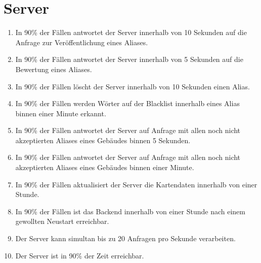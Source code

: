 \section{Server}

\begin{enumerate}
    \item In 90\% der Fällen antwortet der Server innerhalb von 10 Sekunden auf die Anfrage zur Veröffentlichung eines Aliases.
    \item In 90\% der Fällen antwortet der Server innerhalb von 5 Sekunden auf die Bewertung eines Aliases.
    \item In 90\% der Fällen löscht der Server innerhalb von 10 Sekunden einen Alias.
    \item In 90\% der Fällen werden Wörter auf der Blacklist innerhalb eines Alias binnen einer Minute erkannt.
    \item In 90\% der Fällen antwortet der Server auf Anfrage mit allen noch nicht akzeptierten Aliases eines Gebäudes binnen 5 Sekunden.
    \item In 90\% der Fällen antwortet der Server auf Anfrage mit allen noch nicht akzeptierten Aliases eines Gebäudes binnen einer Minute.
    \item In 90\% der Fällen aktualisiert der Server die Kartendaten innerhalb von einer Stunde.
    \item In 90\% der Fällen ist das Backend innerhalb von einer Stunde nach einem gewollten Neustart erreichbar.
    \item Der Server kann simultan bis zu 20 Anfragen pro Sekunde verarbeiten.
    \item Der Server ist in 90\% der Zeit erreichbar. 
\end{enumerate}
